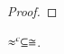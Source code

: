 \begin{proof}
\begin{comment}
	\noi $\mathcal{R}_{n+1}$ satisfies the stratified definition for the bisimulation 
	because $\forall \news{\tilde{s}} \bactout{s}{(x) R} $
%
	\begin{eqnarray*}
		\Gamma; \emptyset; \Sigma_1 \by{\news{\tilde{s}} \bactbout{s}{(x) R}} \Sigma_2'' \proves \newsp{\tilde{s}}{\bout{s}{\abs{x}{R}} P_2} \by{\news{\tilde{s}} \bactbout{s}{(x) R}} P_2
	\end{eqnarray*}
%
	implies that $\exists Q_2, R$ such that
%
	\begin{eqnarray*}
		\Gamma; \emptyset; \Sigma_1 \by{\news{\tilde{s}} \bactbout{s}{(x) R}} \Sigma_2'' \proves \newsp{\tilde{s}}{\bout{s}{\abs{x}{R}} Q_2} \by{\news{\tilde{s}} \bactbout{s}{(x) R}} Q_2
	\end{eqnarray*}
%
	\noi and $\forall s'$
%
	\begin{eqnarray*}
		\Gamma; \emptyset; \Sigma_1'' \ \wb_{n}\ \Sigma_2'' \proves \newsp{\tilde{s}}{P' \Par R \subst{s'}{x}}\ \wb_{n}\ 
		\newsp{\tilde{s}}{Q' \Par R \subst{s'}{x}}
	\end{eqnarray*}
%
\dk{continue from here}
\end{comment}
\begin{comment}
	\noi We apply the induction hypothesis to get that
	$\forall C, s'$
%
	\begin{eqnarray}
		\Gamma; \emptyset; \Sigma_1'' \ \wbc_{n}\ \Sigma_2'' \proves \newsp{\tilde{s}}{\context{C}{P' \Par P \subst{s'}{x}}}\ \wbc_{n}\ 
		\newsp{\tilde{s}}{\context{C}{Q' \Par Q \subst{s'}{x}}} \label{lem:wb_is_wbc3}
	\end{eqnarray}
	\noi Assume $\mathcal{R}_{n+1} = \set{\Gamma; \emptyset; \Sigma_1 \proves P_1 \hastype \Proc, \Gamma; \emptyset; \Sigma_2 \proves Q_1 \hastype \Proc}$.

	\noi $\mathcal{R}_{n+1}$ satisfies the condition for the stratified definition for bisimulation
	because statement~\ref{lem:wbc_is_wb7} implies that
	$\exists Q', s_2$ such that
	statement~\ref{lem:wbc_is_wb8} holds and furthemore statement~\ref{lem:wbc_is_wb9} holds.
\end{comment}
\end{proof}



\begin{lemma}
	\label{lem:wbc_is_cong}
	$\approx^{c} \subseteq \cong$.
\end{lemma}


